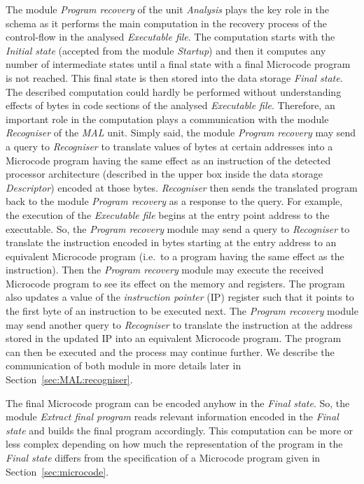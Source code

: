 \documentclass[10pt,twocolumn]{article}
\begin{document}
The module \emph{Program recovery} of the unit \emph{Analysis} plays the key
role in the schema as it performs the main computation in the recovery process
of the control-flow in the analysed \emph{Executable file}. The computation
starts with the \emph{Initial state} (accepted from the module \emph{Startup})
and then it computes any number of intermediate states until a final state with
a final Microcode program is not reached. This final state is then stored into
the data storage \emph{Final state}. The described computation could hardly be
performed without understanding effects of bytes in code sections of the
analysed \emph{Executable file}. Therefore, an important role in the computation
plays a communication with the module \emph{Recogniser} of the \emph{MAL} unit.
Simply said, the module \emph{Program recovery} may send a query to
\emph{Recogniser} to translate values of bytes at certain addresses into a
Microcode program having the same effect as an instruction of the detected
processor architecture (described in the upper box inside the data storage
\emph{Descriptor}) encoded at those bytes. \emph{Recogniser} then sends the
translated program back to the module \emph{Program recovery} as a response to
the query. For example, the execution of the \emph{Executable file} begins at
the entry point address to the executable. So, the \emph{Program recovery}
module may send a query to \emph{Recogniser} to translate the instruction
encoded in bytes starting at the entry address to an equivalent Microcode
program (i.e.~to a program having the same effect as the instruction). Then the
\emph{Program recovery} module may execute the received Microcode program to see
its effect on the memory and registers. The program also updates a value of the
\emph{instruction pointer} (IP) register such that it points to the first byte
of an instruction to be executed next. The \emph{Program recovery} module may
send another query to \emph{Recogniser} to translate the instruction at the
address stored in the updated IP into an equivalent Microcode program. The
program can then be executed and the process may continue further. We describe
the communication of both module in more details later in
Section~\ref{sec:MAL:recogniser}.

The final Microcode program can be encoded anyhow in the \emph{Final state}. So,
the module \emph{Extract final program} reads relevant information encoded in
the \emph{Final state} and builds the final program accordingly. This
computation can be more or less complex depending on how much the representation
of the program in the \emph{Final state} differs from the specification of a
Microcode program given in Section~\ref{sec:microcode}.
\end{document}
